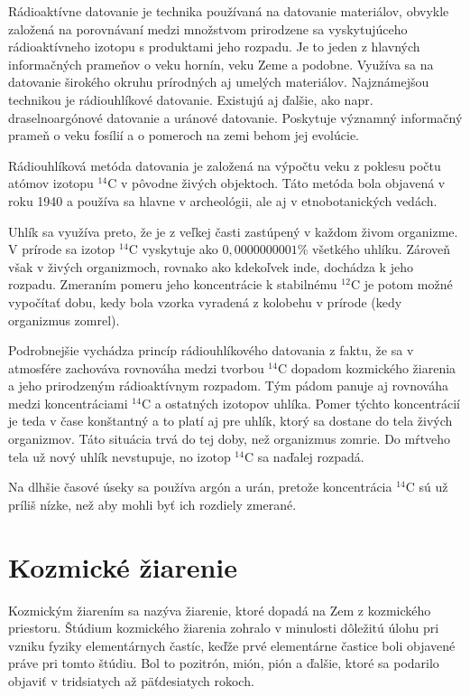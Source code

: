 \documentclass[../../main.tex]{subfiles}
\begin{document}
Rádioaktívne datovanie je technika používaná na datovanie materiálov, obvykle založená na porovnávaní medzi množstvom prirodzene sa vyskytujúceho rádioaktívneho izotopu s produktami jeho rozpadu. Je to jeden z hlavných informačných prameňov o veku hornín, veku Zeme a podobne. Využíva sa na datovanie širokého okruhu prírodných aj umelých materiálov. Najznámejšou technikou je rádiouhlíkové datovanie. Existujú aj ďalšie, ako napr. draselnoargónové datovanie a uránové datovanie. Poskytuje významný informačný prameň o veku fosílií a o pomeroch na zemi behom jej evolúcie.

Rádiouhlíková metóda datovania je založená na výpočtu veku z poklesu počtu atómov izotopu $^{14}$C v pôvodne živých objektoch. Táto metóda bola objavená v roku 1940 a používa sa hlavne v archeológii, ale aj v etnobotanických vedách.

Uhlík sa využíva preto, že je z veľkej časti zastúpený v každom živom organizme. V prírode sa izotop $^{14}$C vyskytuje ako $0,0000000001\%$ všetkého uhlíku. Zároveň však v živých organizmoch, rovnako ako kdekoľvek inde, dochádza k jeho rozpadu. Zmeraním pomeru jeho koncentrácie k stabilnému $^{12}$C je potom možné vypočítať dobu, kedy bola vzorka vyradená z kolobehu v prírode (kedy organizmus zomrel).

Podrobnejšie vychádza princíp rádiouhlíkového datovania z faktu, že sa v atmosfére zachováva rovnováha medzi tvorbou $^{14}$C dopadom kozmického žiarenia a jeho prirodzeným rádioaktívnym rozpadom. Tým pádom panuje aj rovnováha medzi koncentráciami $^{14}$C a ostatných izotopov uhlíka. Pomer týchto koncentrácií je teda v čase konštantný a to platí aj pre uhlík, ktorý sa dostane do tela živých organizmov. Táto situácia trvá do tej doby, než organizmus zomrie. Do mŕtveho tela už nový uhlík nevstupuje, no izotop $^{14}$C sa naďalej rozpadá.

Na dlhšie časové úseky sa používa argón a urán, pretože koncentrácia $^{14}$C sú už príliš nízke, než aby mohli byť ich rozdiely zmerané.

\section{Kozmické žiarenie}

Kozmickým žiarením sa nazýva žiarenie, ktoré dopadá na Zem z kozmického priestoru. Štúdium kozmického žiarenia zohralo v minulosti dôležitú úlohu pri vzniku fyziky elementárnych častíc, keďže prvé elementárne častice boli objavené práve pri tomto štúdiu. Bol to pozitrón, mión, pión a ďalšie, ktoré sa podarilo objaviť v tridsiatych až päťdesiatych rokoch.
\end{document}
